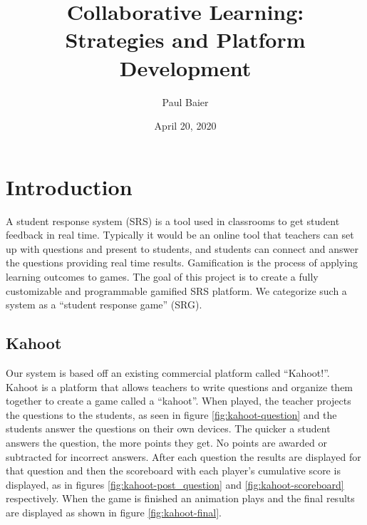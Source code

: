 \documentclass{article}
\title{Collaborative Learning: \\
\normalsize Strategies and Platform Development
}
\author{Paul Baier}
\date{April 20, 2020}
\begin{document}
\maketitle

\section{Introduction}
A student response system (SRS) is a tool used in classrooms to get student feedback in real time. Typically it would be an online tool that teachers can set up with questions and present to students, and students can connect and answer the questions providing real time results. Gamification is the process of applying learning outcomes to games. The goal of this project is to create a fully customizable and programmable gamified SRS platform. We categorize such a system as a ``student response game'' (SRG). 

    \subsection{Kahoot}
        Our system is based off an existing commercial platform called ``Kahoot!''. Kahoot is a platform that allows teachers to write questions and organize them together to create a game called a ``kahoot''. When played, the teacher projects the questions to the students, as seen in figure \ref{fig:kahoot-question} and the students answer the questions on their own devices. The quicker a student answers the question, the more points they get. No points are awarded or subtracted for incorrect answers. After each question the results are displayed for that question and then the scoreboard with each player's cumulative score is displayed, as in figures \ref{fig:kahoot-post_question} and \ref{fig:kahoot-scoreboard} respectively. When the game is finished an animation plays and the final results are displayed as shown in figure \ref{fig:kahoot-final}.
        
\end{document}
